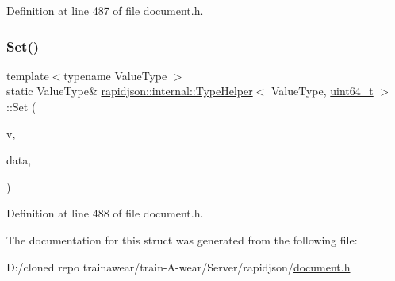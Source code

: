 Definition at line 487 of file document.\+h.


\begin{DoxyCode}{0}

\end{DoxyCode}
\mbox{\label{structrapidjson_1_1internal_1_1_type_helper_3_01_value_type_00_01uint64__t_01_4_a4ad26bc0e14fac07902b617307fbb5a9}} 
\subsubsection{\texorpdfstring{Set()}{Set()}\hspace{0.1cm}{\footnotesize\ttfamily [2/2]}}
{\footnotesize\ttfamily template$<$typename Value\+Type $>$ \\
static Value\+Type\& \mbox{\hyperlink{structrapidjson_1_1internal_1_1_type_helper}{rapidjson\+::internal\+::\+Type\+Helper}}$<$ Value\+Type, \mbox{\hyperlink{stdint_8h_aec6fcb673ff035718c238c8c9d544c47}{uint64\+\_\+t}} $>$\+::Set (\begin{DoxyParamCaption}\item[{Value\+Type \&}]{v,  }\item[{\mbox{\hyperlink{stdint_8h_aec6fcb673ff035718c238c8c9d544c47}{uint64\+\_\+t}}}]{data,  }\item[{typename Value\+Type\+::\+Allocator\+Type \&}]{ }\end{DoxyParamCaption})\hspace{0.3cm}{\ttfamily [static]}}



Definition at line 488 of file document.\+h.


\begin{DoxyCode}{0}

\end{DoxyCode}


The documentation for this struct was generated from the following file\+:\begin{DoxyCompactItemize}
\item 
D\+:/cloned repo trainawear/train-\/\+A-\/wear/\+Server/rapidjson/\mbox{\hyperlink{document_8h}{document.\+h}}\end{DoxyCompactItemize}
